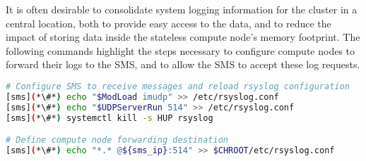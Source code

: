 It is often desirable to consolidate system logging information for the cluster in a
central location, both to provide easy access to the data, and to reduce the
impact of storing data inside the stateless compute node's memory footprint. The
following commands highlight the steps necessary to configure compute nodes to
forward their logs to the SMS, and to allow the SMS to accept these log requests.


\begin{lstlisting}[language=bash,keywords={}]
# Configure SMS to receive messages and reload rsyslog configuration
[sms](*\#*) echo "$ModLoad imudp" >> /etc/rsyslog.conf
[sms](*\#*) echo "$UDPServerRun 514" >> /etc/rsyslog.conf
[sms](*\#*) systemctl kill -s HUP rsyslog

# Define compute node forwarding destination
[sms](*\#*) echo "*.* @${sms_ip}:514" >> $CHROOT/etc/rsyslog.conf
\end{lstlisting}
